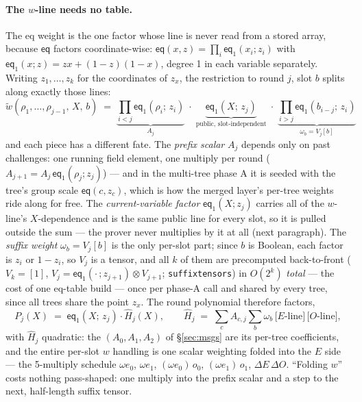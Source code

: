 \documentclass[11pt]{article}
\newcommand{\mle}[1]{\widetilde{#1}}
\newcommand{\eq}{\mathsf{eq}}
\newcommand{\code}[1]{{\def\_{\textunderscore\allowbreak}\texttt{#1}}}
\theoremstyle{definition}
\begin{document}
\paragraph{The $w$-line needs no table.}
The eq weight is the one factor whose line is never read from a stored
array, because $\eq$ factors coordinate-wise:
$\eq(x, z) = \prod_i \eq_1(x_i; z_i)$ with
$\eq_1(x; z) = zx + (1{-}z)(1{-}x)$, degree 1 in each variable
separately.  Writing $z_1, \dots, z_k$ for the coordinates of $z_x$,
the restriction to round $j$, slot $b$ splits along exactly those
lines:
\[
  \mle{w}(\rho_1, \dots, \rho_{j-1},\, X,\, b)
  \;=\;
  \underbrace{\prod_{i<j}\eq_1(\rho_i;\, z_i)}_{\textstyle A_j}
  \;\cdot\;
  \underbrace{\eq_1(X;\, z_j)}_{\text{public, slot-independent}}
  \;\cdot\;
  \underbrace{\prod_{i>j}\eq_1(b_{i-j};\, z_i)}_{\textstyle
    \omega_b = V_j[b]}
\]
and each piece has a different fate.  The \emph{prefix scalar} $A_j$
depends only on past challenges: one running field element, one
multiply per round ($A_{j+1} = A_j\,\eq_1(\rho_j; z_j)$) --- and in
the multi-tree phase A it is seeded with the tree's group scale
$\eq(c, z_c)$, which is how the merged layer's per-tree weights ride
along for free.  The \emph{current-variable factor} $\eq_1(X; z_j)$
carries all of the $w$-line's $X$-dependence and is the same public
line for every slot, so it is pulled outside the sum --- the prover
never multiplies by it at all (next paragraph).  The \emph{suffix
weight} $\omega_b = V_j[b]$ is the only per-slot part; since $b$ is
Boolean, each factor is $z_i$ or $1 - z_i$, so $V_j$ is a tensor, and
all $k$ of them are precomputed back-to-front ($V_k = [1]$,
$V_j = \eq_1(\cdot\,; z_{j+1}) \otimes V_{j+1}$;
\code{suffix\_tensors}) in $O(2^k)$ \emph{total} --- the cost of one
eq-table build --- once per phase-A call and shared by every tree,
since all trees share the point $z_x$.  The round polynomial
therefore factors,
\[
  P_j(X) \;=\; \eq_1(X;\, z_j)\cdot \hat H_j(X),
  \qquad
  \hat H_j \;=\; \sum_{c} A_{c,j} \sum_b \omega_b\,
    \big[\text{$E$-line}\big]\,\big[\text{$O$-line}\big],
\]
with $\hat H_j$ quadratic: the $(A_0, A_1, A_2)$ of \S\ref{sec:msgs}
are its per-tree coefficients, and the entire per-slot $w$ handling is
one scalar weighting folded into the $E$ side --- the 5-multiply
schedule $\omega e_0$, $\omega e_1$, $(\omega e_0)\,o_0$,
$(\omega e_1)\,o_1$, $\Delta E\,\Delta O$.  ``Folding $w$'' costs
nothing pass-shaped: one multiply into the prefix scalar and a step to
the next, half-length suffix tensor.
\end{document}

